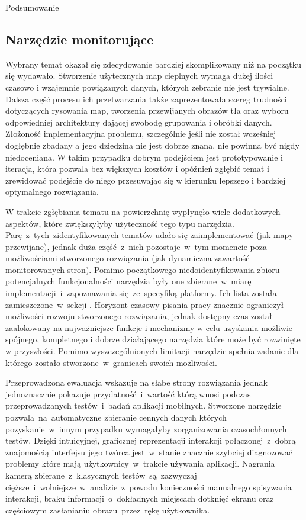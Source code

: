 \begin{chapter}{Podsumowanie}
	\subsection{Narzędzie monitorujące}
	Wybrany temat okazał się zdecydowanie bardziej skomplikowany niż na początku się wydawało. Stworzenie użytecznych map cieplnych wymaga dużej ilości czasowo i wzajemnie powiązanych danych, których zebranie nie jest trywialne. Dalsza część procesu ich przetwarzania także zaprezentowała szereg trudności dotyczących rysowania map, tworzenia przewijanych obrazów tła oraz wyboru odpowiedniej architektury dającej swobodę grupowania i obróbki danych. Złożoność implementacyjna problemu, szczególnie jeśli nie został wcześniej dogłębnie zbadany a jego dziedzina nie jest dobrze znana, nie powinna być nigdy niedoceniana. W takim przypadku dobrym podejściem jest prototypowanie i iteracja, która pozwala bez większych kosztów i opóźnień zgłębić temat i zrewidować podejście do niego przesuwając się w kierunku lepszego i bardziej optymalnego rozwiązania.
	
	W trakcie zgłębiania tematu na powierzchnię wypłynęło wiele dodatkowych aspektów, które zwiększyłyby użyteczność tego typu narzędzia. Parę~z~tych~zidentyfikowanych tematów udało się zaimplementować (jak mapy przewijane), jednak duża część~z~nich pozostaje~w~tym momencie poza możliwościami stworzonego rozwiązania (jak dynamiczna zawartość monitorowanych stron). Pomimo początkowego niedoidentyfikowania zbioru potencjalnych funkcjonalności narzędzia były one zbierane~w~miarę implementacji~i~zapoznawania się~ze~specyfiką platformy. Ich lista została zamieszczone~w~sekcji . Horyzont czasowy pisania pracy znacznie ograniczył możliwości rozwoju stworzonego rozwiązania, jednak dostępny czas został zaalokowany na najważniejsze funkcje i mechanizmy w celu uzyskania możliwie spójnego, kompletnego i dobrze działającego narzędzia które może być rozwinięte w przyszłości. Pomimo wyszczególnionych limitacji narzędzie spełnia zadanie dla którego zostało stworzone~w~granicach swoich możliwości. 
	
	Przeprowadzona ewaluacja wskazuje na słabe strony rozwiązania jednak jednoznacznie pokazuje przydatność~i~wartość którą wnosi podczas przeprowadzanych testów~i~badań aplikacji mobilnych. Stworzone narzędzie pozwala~na~automatyczne zbieranie cennych danych których pozyskanie~w~innym przypadku wymagałyby zorganizowania czasochłonnych testów. Dzięki intuicyjnej, graficznej reprezentacji interakcji połączonej~z~dobrą znajomością interfejsu jego twórca jest~w~stanie znacznie szybciej diagnozować problemy które mają użytkownicy~w~trakcie używania aplikacji. Nagrania kamerą zbierane~z~klasycznych testów~są~zazwyczaj cięższe~i~wolniejsze~w~analizie~z~powodu konieczności manualnego spisywania interakcji, braku informacji~o~dokładnych miejscach dotknięć ekranu oraz częściowym zasłanianiu obrazu~przez~rękę użytkownika. 


\end{chapter}
